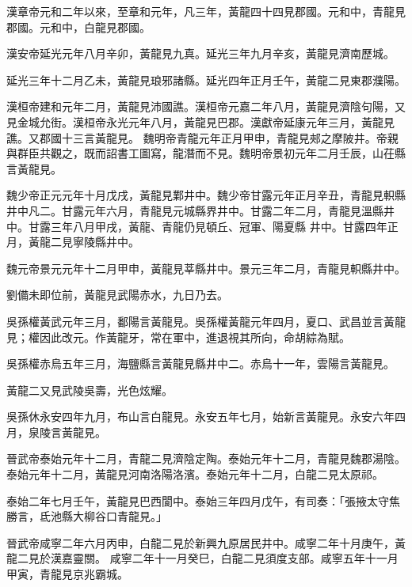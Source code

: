 \begin{pinyinscope}
 漢章帝元和二年以來，至章和元年，凡三年，黃龍四十四見郡國。元和中，青龍見郡國。元和中，白龍見郡國。



 漢安帝延光元年八月辛卯，黃龍見九真。延光三年九月辛亥，黃龍見濟南歷城。



 延光三年十二月乙未，黃龍見琅邪諸縣。延光四年正月壬午，黃龍二見東郡濮陽。



 漢桓帝建和元年二月，黃龍見沛國譙。漢桓帝元嘉二年八月，黃龍見濟陰句陽，又見金城允街。漢桓帝永光元年八月，黃龍見巴郡。漢獻帝延康元年三月，黃龍見譙。又郡國十三言黃龍見。
 魏明帝青龍元年正月甲申，青龍見郟之摩陂井。帝親與群臣共觀之，既而詔書工圖寫，龍潛而不見。魏明帝景初元年二月壬辰，山茌縣言黃龍見。



 魏少帝正元元年十月戊戌，黃龍見鄴井中。魏少帝甘露元年正月辛丑，青龍見軹縣井中凡二。甘露元年六月，青龍見元城縣界井中。甘露二年二月，青龍見溫縣井中。甘露三年八月甲戌，黃龍、青龍仍見頓丘、冠軍、陽夏縣
 井中。甘露四年正月，黃龍二見寧陵縣井中。



 魏元帝景元元年十二月甲申，黃龍見莘縣井中。景元三年二月，青龍見軹縣井中。



 劉備未即位前，黃龍見武陽赤水，九日乃去。



 吳孫權黃武元年三月，鄱陽言黃龍見。吳孫權黃龍元年四月，夏口、武昌並言黃龍見；權因此改元。作黃龍牙，常在軍中，進退視其所向，命胡綜為賦。



 吳孫權赤烏五年三月，海鹽縣言黃龍見縣井中二。赤烏十一年，雲陽言黃龍見。



 黃龍二又見武陵吳壽，光色炫耀。



 吳孫休永安四年九月，布山言白龍見。永安五年七月，始新言黃龍見。永安六年四月，泉陵言黃龍見。



 晉武帝泰始元年十二月，青龍二見濟陰定陶。泰始元年十二月，青龍見魏郡湯陰。
 泰始元年十二月，黃龍見河南洛陽洛濱。泰始元年十二月，白龍二見太原祁。



 泰始二年七月壬午，黃龍見巴西閬中。泰始三年四月戊午，有司奏：「張掖太守焦勝言，氐池縣大柳谷口青龍見。」



 晉武帝咸寧二年六月丙申，白龍二見於新興九原居民井中。咸寧二年十月庚午，黃龍二見於漢嘉靈關。
 咸寧二年十一月癸巳，白龍二見須度支部。咸寧五年十一月甲寅，青龍見京兆霸城。




\end{pinyinscope}
